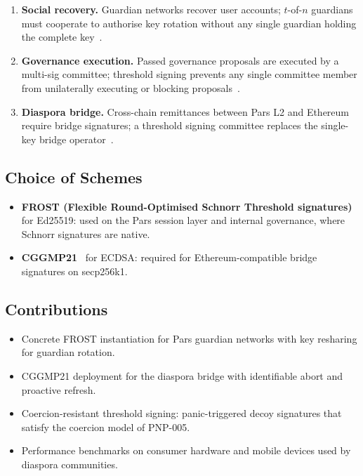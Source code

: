 \documentclass[11pt,a4paper]{article}
\begin{document}
\begin{enumerate}
    \item \textbf{Social recovery.}  Guardian networks recover user
    accounts; $t$-of-$n$ guardians must cooperate to authorise key
    rotation without any single guardian holding the complete
    key~\cite{pars_social_recovery}.
    \item \textbf{Governance execution.}  Passed governance proposals
    are executed by a multi-sig committee; threshold signing prevents
    any single committee member from unilaterally executing or blocking
    proposals~\cite{pars_shadow_governance}.
    \item \textbf{Diaspora bridge.}  Cross-chain remittances between
    Pars L2 and Ethereum require bridge signatures; a threshold signing
    committee replaces the single-key bridge operator~\cite{pars_diaspora_bridge}.
\end{enumerate}

\subsection{Choice of Schemes}

\begin{itemize}
    \item \textbf{FROST (Flexible Round-Optimised Schnorr Threshold
    signatures)}~\cite{komlo2020frost} for Ed25519: used on the Pars
    session layer and internal governance, where Schnorr signatures are
    native.
    \item \textbf{CGGMP21}~\cite{canetti2021cggmp} for ECDSA: required
    for Ethereum-compatible bridge signatures on secp256k1.
\end{itemize}

\subsection{Contributions}

\begin{itemize}
    \item Concrete FROST instantiation for Pars guardian networks with
    key resharing for guardian rotation.
    \item CGGMP21 deployment for the diaspora bridge with identifiable
    abort and proactive refresh.
    \item Coercion-resistant threshold signing: panic-triggered decoy
    signatures that satisfy the coercion model of PNP-005.
    \item Performance benchmarks on consumer hardware and mobile devices
    used by diaspora communities.
\end{itemize}
\end{document}
